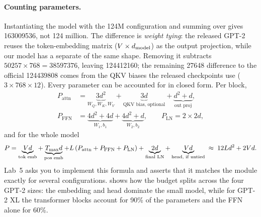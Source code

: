 \paragraph{Counting parameters.}
Instantiating the model with the 124M configuration and summing  over
 gives \num{163009536}, not 124 million. The difference is
\emph{weight tying}: the released GPT-2 reuses the token-embedding matrix ($V\times d_{\text{model}}$) as
the output projection, while our model has a separate  of the same shape.
Removing it subtracts $\num{50257}\times768=\num{38597376}$, leaving \num{124412160}; the
remaining \num{27648} difference to the official \num{124439808} comes from the QKV biases the
released checkpoints use ($3\times768\times12$). Every parameter can be accounted for in closed
form. Per block,
\begin{align}
P_\text{attn} &= \underbrace{3d^2}_{W_Q,W_K,W_V} + \underbrace{3d}_{\text{QKV bias, optional}} + \underbrace{d^2+d}_{\text{out proj}}, \\
P_\text{FFN}  &= \underbrace{4d^2+4d}_{W_1,b_1} + \underbrace{4d^2+d}_{W_2,b_2},\qquad
P_\text{LN} = 2\times 2d,
\end{align}
and for the whole model
\begin{equation}
P = \underbrace{V d}_{\text{tok emb}} + \underbrace{T_\text{max} d}_{\text{pos emb}}
 + L\,(P_\text{attn}+P_\text{FFN}+P_\text{LN}) + \underbrace{2d}_{\text{final LN}}
 + \underbrace{V d}_{\text{head, if untied}} \;\approx\; 12Ld^2 + 2V d .
\label{eq:gpt:params}
\end{equation}
Lab~5 asks you to implement this formula and asserts that it matches the module exactly for
several configurations.  shows how the budget splits across the
four GPT-2 sizes: the embedding and head dominate the small model, while for GPT-2 XL the
transformer blocks account for 90\% of the parameters and the FFN alone for 60\%.

